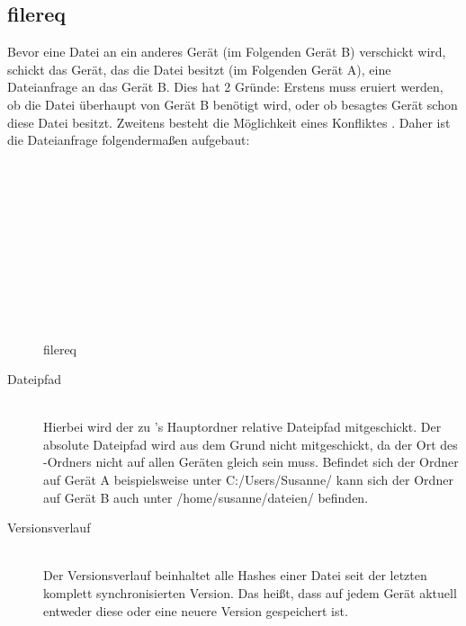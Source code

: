 \subsection{\gls{filereq}} \label{Dateianfrage}
Bevor eine Datei an ein anderes Gerät (im Folgenden Gerät B) verschickt wird, schickt das Gerät, das die Datei besitzt (im Folgenden Gerät A), eine Dateianfrage an das Gerät B. Dies hat 2 Gründe: Erstens muss eruiert werden, ob die Datei überhaupt von Gerät B benötigt wird, oder ob besagtes Gerät schon diese Datei besitzt. Zweitens besteht die Möglichkeit eines Konfliktes . Daher ist die Dateianfrage folgendermaßen aufgebaut:
\begin{figure}[H]
\begin{centering}

\begin{bytefield}[bitwidth=3em]{8}
	\\
	 \\
	
	\begin{rightwordgroup}{\isprotomsgtype}
	\end{rightwordgroup} \\
	
	\begin{rightwordgroup}{\isprotomsgdata}
		 \\
		\skippedwords \\
		 \\
		 \\
		\skippedwords \\
	\end{rightwordgroup}
	
\end{bytefield}
\par\end{centering}
\protect\caption{\gls{filereq}}
\end{figure}
\begin{description} 
	\item[{Dateipfad}] \hfill \\
		Hierbei wird der zu \sblit's Hauptordner relative Dateipfad mitgeschickt. Der absolute Dateipfad wird aus dem Grund nicht mitgeschickt, da der Ort des \sblit-Ordners nicht auf allen Geräten gleich sein muss. Befindet sich der Ordner auf Gerät A beispielsweise unter C:/Users/Susanne/ kann sich der Ordner auf Gerät B auch unter /home/susanne/dateien/ befinden.
	\item[{Versionsverlauf}] \hfill \\
		Der Versionsverlauf beinhaltet alle Hashes einer Datei seit der letzten komplett synchronisierten Version. Das heißt, dass auf jedem Gerät aktuell entweder diese oder eine neuere Version gespeichert ist.
\end{description}

